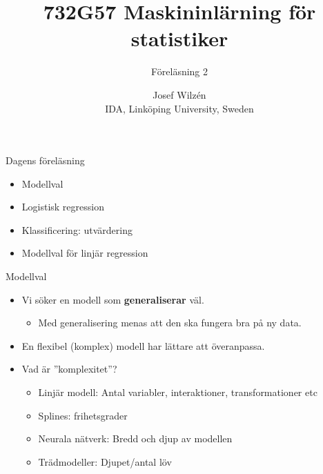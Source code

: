 \documentclass[10pt,english]{beamer}
\title{732G57  Maskininlärning för statistiker }
\subtitle{Föreläsning 2}
\date{}
\author{Josef Wilzén \\ IDA, Linköping University, Sweden}
\begin{document}
\maketitle

\begin{frame}{Dagens föreläsning}
    
    \begin{itemize}
        \item Modellval
        \item Logistisk regression
        \item Klassificering: utvärdering
        \item Modellval för linjär regression
    \end{itemize}

\end{frame}

\begin{frame}{Modellval}
    
    \begin{itemize}
        \item Vi söker en modell som \textbf{generaliserar} väl.
        \begin{itemize}
            \item Med generalisering menas att den ska fungera bra på ny data.
        \end{itemize}
        \item En flexibel (komplex) modell har lättare att överanpassa.
        \item Vad är ''komplexitet''?
        \begin{itemize}
            \item Linjär modell: Antal variabler, interaktioner, transformationer etc
            \item Splines: frihetsgrader
            \item Neurala nätverk: Bredd och djup av modellen
            \item Trädmodeller: Djupet/antal löv
        \end{itemize}
    \end{itemize}

\end{frame}
\end{document}
